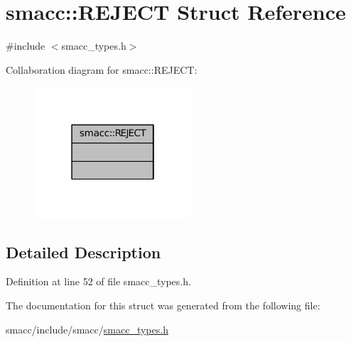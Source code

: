 \hypertarget{structsmacc_1_1REJECT}{}\section{smacc\+:\+:R\+E\+J\+E\+CT Struct Reference}
\label{structsmacc_1_1REJECT}


{\ttfamily \#include $<$smacc\+\_\+types.\+h$>$}



Collaboration diagram for smacc\+:\+:R\+E\+J\+E\+CT\+:
\nopagebreak
\begin{figure}[H]
\begin{center}
\leavevmode
\includegraphics[width=166pt]{structsmacc_1_1REJECT__coll__graph}
\end{center}
\end{figure}


\subsection{Detailed Description}


Definition at line 52 of file smacc\+\_\+types.\+h.



The documentation for this struct was generated from the following file\+:\begin{DoxyCompactItemize}
\item 
smacc/include/smacc/\hyperlink{smacc__types_8h}{smacc\+\_\+types.\+h}\end{DoxyCompactItemize}
